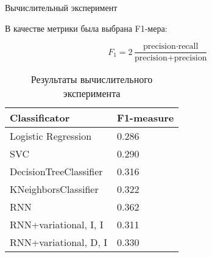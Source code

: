 \documentclass{beamer}
\begin{document}
\begin{frame}{Вычислительный эксперимент}

В качестве метрики была выбрана F1-мера:

$$F_1 = 2 \frac{\text{precision} \cdot \text{recall}}{\text{precision} + \text{precision}}$$


\vspace{-0.5cm}

\begin{table}[H]
	\centering
	\caption{Результаты вычислительного эксперимента}
	\label{my-label1}
	\begin{tabular}{|l|l|}
		\hline
		Classificator          & F1-measure \\ \hline
		Logistic Regression    & 0.286      \\ \hline
		SVC                    & 0.290      \\ \hline
		DecisionTreeClassifier & 0.316      \\ \hline
		KNeighborsClassifier   & 0.322      \\ \hline
		RNN                    & 0.362      \\ \hline
		RNN+variational, I, I  & 0.311      \\ \hline
		RNN+variational, D, I  & 0.330      \\ \hline
	\end{tabular}
\end{table}

\end{frame}

%
%
%
\end{document}

